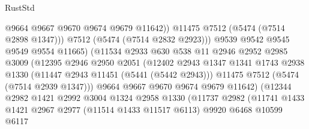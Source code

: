 \begin{lexlean}{RustStd}
\begin{coremodule}
                                    @9664
                                    @9667
                                    @9670
                                    @9674
                                    @9679
                                    @11642))
                                @11475
                                @7512
                                (@5474 (@7514 @2898 @1347)))
                              @7512
                              (@5474 (@7514 @2832 @2923)))
                            @9539
                            @9542
                            @9545
                            @9549
                            @9554
                            @11665)
                          (@11534
                            @2933
                            @630
                            @538
                            @11
                            @2946
                            @2952
                            @2985
                            @3009
                            (@12395
                              @2946
                              @2950
                              @2051
                              (@12402
                                @2943
                                @1347
                                @1341
                                @1743
                                @2938
                                @1330
                                (@11447 @2943 @11451 (@5441 (@5442 @2943)))
                                @11475
                                @7512
                                (@5474 (@7514 @2939 @1347)))
                              @9664
                              @9667
                              @9670
                              @9674
                              @9679
                              @11642)
                            (@12344
                              @2982
                              @1421
                              @2992
                              @3004
                              @1324
                              @2958
                              @1330
                              (@11737
                                @2982
                                (@11741
                                  @1433
                                  @1421
                                  @2967
                                  @2977
                                  (@11514 @1433 @11517 @6113)
                                  @9920
                                  @6468
                                  @10599
                                  @6117

\end{coremodule}
\end{lexlean}
